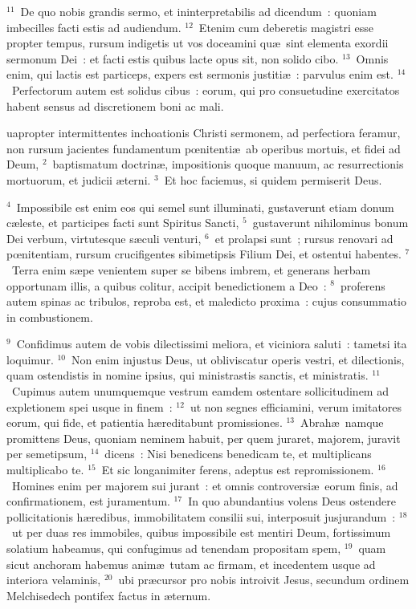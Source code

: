 ${}^{11}$~De quo nobis grandis sermo, et ininterpretabilis ad dicendum~: quoniam imbecilles facti estis ad audiendum.
${}^{12}$~Etenim cum deberetis magistri esse propter tempus, rursum indigetis ut vos doceamini qu\ae\ sint elementa exordii sermonum Dei~: et facti estis quibus lacte opus sit, non solido cibo.
${}^{13}$~Omnis enim, qui lactis est particeps, expers est sermonis justiti\ae~: parvulus enim est.
${}^{14}$~Perfectorum autem est solidus cibus~: eorum, qui pro consuetudine exercitatos habent sensus ad discretionem boni ac mali.

\bchapter
{}uapropter intermittentes inchoationis Christi sermonem, ad perfectiora feramur, non rursum jacientes fundamentum pœnitenti\ae\ ab operibus mortuis, et fidei ad Deum,
${}^{2}$~baptismatum doctrin\ae , impositionis quoque manuum, ac resurrectionis mortuorum, et judicii \ae terni.
${}^{3}$~Et hoc faciemus, si quidem permiserit Deus.


${}^{4}$~Impossibile est enim eos qui semel sunt illuminati, gustaverunt etiam donum c\ae leste, et participes facti sunt Spiritus Sancti,
${}^{5}$~gustaverunt nihilominus bonum Dei verbum, virtutesque s\ae culi venturi,
${}^{6}$~et prolapsi sunt~; rursus renovari ad pœnitentiam, rursum crucifigentes sibimetipsis Filium Dei, et ostentui habentes.
${}^{7}$~Terra enim s\ae pe venientem super se bibens imbrem, et generans herbam opportunam illis, a quibus colitur, accipit benedictionem a Deo~:
${}^{8}$~proferens autem spinas ac tribulos, reproba est, et maledicto proxima~: cujus consummatio in combustionem.


${}^{9}$~Confidimus autem de vobis dilectissimi meliora, et viciniora saluti~: tametsi ita loquimur.
${}^{10}$~Non enim injustus Deus, ut obliviscatur operis vestri, et dilectionis, quam ostendistis in nomine ipsius, qui ministrastis sanctis, et ministratis.
${}^{11}$~Cupimus autem unumquemque vestrum eamdem ostentare sollicitudinem ad expletionem spei usque in finem~:
${}^{12}$~ut non segnes efficiamini, verum imitatores eorum, qui fide, et patientia h\ae reditabunt promissiones.
${}^{13}$~Abrah\ae\ namque promittens Deus, quoniam neminem habuit, per quem juraret, majorem, juravit per semetipsum,
${}^{14}$~dicens~: Nisi benedicens benedicam te, et multiplicans multiplicabo te.
${}^{15}$~Et sic longanimiter ferens, adeptus est repromissionem.
${}^{16}$~Homines enim per majorem sui jurant~: et omnis controversi\ae\ eorum finis, ad confirmationem, est juramentum.
${}^{17}$~In quo abundantius volens Deus ostendere pollicitationis h\ae redibus, immobilitatem consilii sui, interposuit jusjurandum~:
${}^{18}$~ut per duas res immobiles, quibus impossibile est mentiri Deum, fortissimum solatium habeamus, qui confugimus ad tenendam propositam spem,
${}^{19}$~quam sicut anchoram habemus anim\ae\ tutam ac firmam, et incedentem usque ad interiora velaminis,
${}^{20}$~ubi pr\ae cursor pro nobis introivit Jesus, secundum ordinem Melchisedech pontifex factus in \ae ternum.

